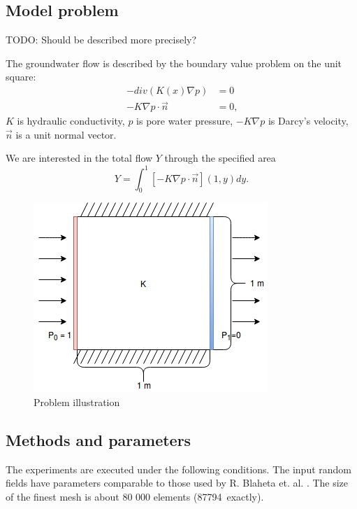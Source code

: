 \documentclass{article}
\def\todo#1{{\color{red}TODO: #1}}
\begin{document}
\subsection{Model problem}\label{model_problem}
\todo{Should be described more precisely?}

The groundwater flow is described by the boundary value problem on the unit square:
\begin{align}
-div(K(x)\nabla p) &= 0 \\ \nonumber
-K \nabla p  \cdot \vec{n} &= 0\text{,}
\end{align}
$K$ is hydraulic conductivity, $p$ is pore water pressure, $-K \nabla p$ is Darcy’s velocity, $\vec{n}$ is a unit normal vector.

We are interested in the total flow $Y$ through the specified area
\begin{equation}
Y = \int_{0}^{1}[-K\nabla p \cdot \vec{n}] (1, y) dy\text{.}
\end{equation}

\begin{figure}[!htp]
\centering
\includegraphics[width=0.5\linewidth]{porous_media_flow/problem_illustration.png}
\caption{Problem illustration}
\label{fig:benchmark_task}
\centering
\end{figure}
\FloatBarrier

\subsection{Methods and parameters}
The experiments are executed under the following conditions.
The input random fields have parameters comparable to those used by R. Blaheta et. al. \cite{Blaheta20160413}. The size of the finest mesh is about 80 000 elements (87794~exactly). 
\end{document}
